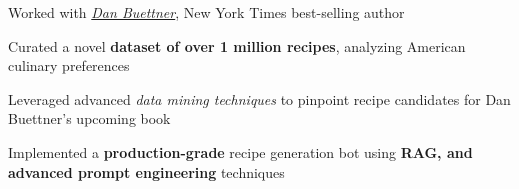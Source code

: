 \begin{cvskills}
{
\begin{cvitems}
\item[] Worked with \textit{\href{https://www.bluezones.com/dan-buettner/}{Dan Buettner}}, New York Times best-selling author
\item Curated a novel \textbf{\bodyfontlight dataset of over 1 million recipes}, analyzing American culinary preferences
\item Leveraged advanced \emph{data mining techniques} to pinpoint recipe candidates for Dan Buettner's upcoming book
\item Implemented a \textbf{\bodyfontlight production-grade} recipe generation bot using \textbf{\bodyfontlight RAG, and advanced prompt engineering} techniques
\end{cvitems}
}





\end{cvskills}
